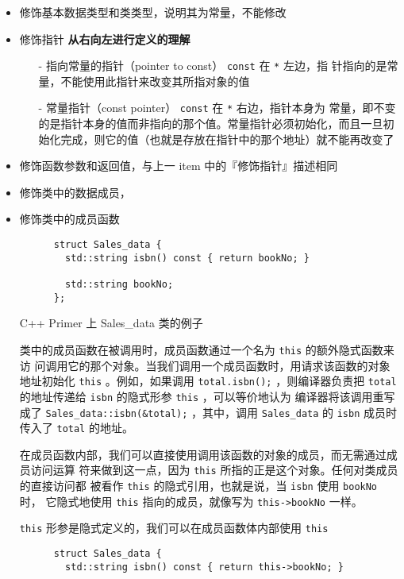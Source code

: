 \begin{itemize}
\item 修饰基本数据类型和类类型，说明其为常量，不能修改
\item 修饰指针 \textbf{从右向左进行定义的理解}
  \begin{itemize}
  \item [-] 指向常量的指针（pointer to const） \verb|const| 在 \verb|*| 左边，指
    针指向的是常量，不能使用此指针来改变其所指对象的值
  \item [-] 常量指针（const pointer） \verb|const| 在 \verb|*| 右边，指针本身为
    常量，即不变的是指针本身的值而非指向的那个值。常量指针必须初始化，而且一旦初
    始化完成，则它的值（也就是存放在指针中的那个地址）就不能再改变了
  \end{itemize}
\item 修饰函数参数和返回值，与上一 item 中的『修饰指针』描述相同
\item 修饰类中的数据成员，
\item 修饰类中的成员函数

  \begin{sourcecode}[hbtp]
    \begin{Verbatim}
      struct Sales_data {
        std::string isbn() const { return bookNo; }

        std::string bookNo;
      };
    \end{Verbatim}
    \caption{C++ Primer 上 Sales\_data 类的例子}
  \end{sourcecode}

  类中的成员函数在被调用时，成员函数通过一个名为 \verb|this| 的额外隐式函数来访
  问调用它的那个对象。当我们调用一个成员函数时，用请求该函数的对象地址初始化
  \verb|this| 。例如，如果调用 \verb|total.isbn();| ，则编译器负责把
  \verb|total| 的地址传递给 \verb|isbn| 的隐式形参 \verb|this| ，可以等价地认为
  编译器将该调用重写成了 \verb|Sales_data::isbn(&total);| ，其中，调用
  \verb|Sales_data| 的 \verb|isbn| 成员时传入了 \verb|total| 的地址。

  在成员函数内部，我们可以直接使用调用该函数的对象的成员，而无需通过成员访问运算
  符来做到这一点，因为 \verb|this| 所指的正是这个对象。任何对类成员的直接访问都
  被看作 \verb|this| 的隐式引用，也就是说，当 \verb|isbn| 使用 \verb|bookNo| 时，
  它隐式地使用 \verb|this| 指向的成员，就像写为 \verb|this->bookNo| 一样。

  \verb|this| 形参是隐式定义的，我们可以在成员函数体内部使用 \verb|this|

  \begin{sourcecode}[hbtp]
    \begin{Verbatim}
      struct Sales_data {
        std::string isbn() const { return this->bookNo; }


\end{Verbatim}
\end{sourcecode}
\end{itemize}
